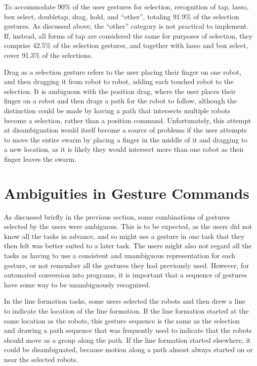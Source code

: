 To accommodate 90\% of the user gestures for selection, recognition of tap, lasso, box select, doubletap, drag, hold, and ``other'', totaling 91.9\% of the selection gestures.
As discussed above, the ``other'' category is not practical to implement. 
If, instead, all forms of tap are considered the same for purposes of selection, they comprise 42.5\% of the selection gestures, and together with lasso and box select, cover 91.3\% of the selections. 

Drag as a selection gesture refers to the user placing their finger on one robot, and then dragging it from robot to robot, adding each touched robot to the selection. 
It is ambiguous with the position drag, where the user places their finger on a robot and then drags a path for the robot to follow, although the distinction could be made by having a path that intersects multiple robots become a selection, rather than a position command. 
Unfortunately, this attempt at disambiguation would itself become a source of problems if the user attempts to move the entire swarm by placing a finger in the middle of it and dragging to a new location, as it is likely they would intersect more than one robot as their finger leaves the swarm.

\section{Ambiguities in Gesture Commands}

As discussed briefly in the previous section, some combinations of gestures selected by the users were ambiguous. 
This is to be expected, as the users did not know all the tasks in advance, and so might use a gesture in one task that they then felt was better suited to a later task.
The users might also not regard all the tasks as having to use a consistent and unambiguous representation for each gesture, or not remember all the gestures they had previously used. 
However, for automated conversion into programs, it is important that a sequence of gestures have some way to be unambiguously recognized. 

In the line formation tasks, some users selected the robots and then drew a line to indicate the location of the line formation.
If the line formation started at the same location as the robots, this gesture sequence is the same as the selection and drawing a path sequence that was frequently used to indicate that the robots should move as a group along the path. 
If the line formation started elsewhere, it could be disambiguated, because motion along a path almost always started on or near the selected robots.  

